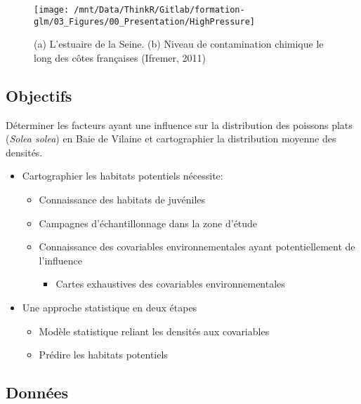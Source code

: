 \documentclass[french,a4paper]{article}
\providecommand{\tightlist}{%
  \setlength{\itemsep}{0pt}\setlength{\parskip}{0pt}}
\begin{document}
\begin{figure}[!h]

{\centering \texttt{[image: /mnt/Data/ThinkR/Gitlab/formation-glm/03\_Figures/00\_Presentation/HighPressure]} 

}

\caption{(a) L'estuaire de la Seine. (b) Niveau de contamination chimique le long des côtes françaises (Ifremer, 2011)}\label{fig:figHighPressure}
\end{figure}

\hypertarget{objectifs}{%
\subsection{Objectifs}\label{objectifs}}

Déterminer les facteurs ayant une influence sur la distribution des poissons plats (\emph{Solea solea}) en Baie de Vilaine et cartographier la distribution moyenne des densités.

\begin{itemize}
\tightlist
\item
  Cartographier les habitats potentiels nécessite:

  \begin{itemize}
  \tightlist
  \item
    Connaissance des habitats de juvéniles
  \item
    Campagnes d'échantillonnage dans la zone d'étude
  \item
    Connaissance des covariables environnementales ayant potentiellement de l'influence

    \begin{itemize}
    \tightlist
    \item
      Cartes exhaustives des covariables environnementales
    \end{itemize}
  \end{itemize}
\item
  Une approche statistique en deux étapes

  \begin{itemize}
  \tightlist
  \item
    Modèle statistique reliant les densités aux covariables
  \item
    Prédire les habitats potentiels
  \end{itemize}
\end{itemize}

\hypertarget{donnees}{%
\subsection{Données}\label{donnees}}
\end{document}
